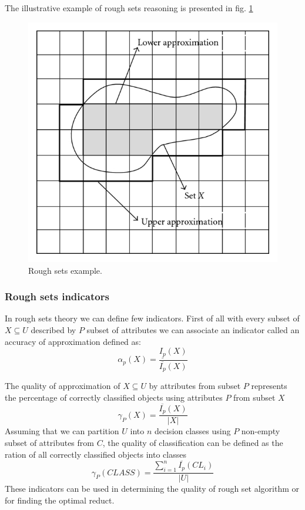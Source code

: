 The illustrative example of rough sets reasoning is presented in fig.
\ref{fig:rough_set_example}
\begin{figure}[H]
    \begin{center}
        \includegraphics{fig/rough_set.png}
    \end{center}
    \caption{Rough sets example.}
    \label{fig:rough_set_example}
\end{figure}

\subsubsection{Rough sets indicators}
\label{cha:Rough_sets_indicators}
In rough sets theory we can define few indicators. First of all with every 
subset of $X \subseteq U$ described by $P$ subset of attributes we can 
associate an indicator called an accuracy of approximation defined as:
$$\alpha_p(X)=\frac{\underline{I_p}(X)}{\overline{I_p}(X)}$$

The quality of approximation of $X \subseteq U$ by attributes from subset $P$
represents the percentage of correctly classified objects using attributes $P$
from subset $X$
$$\gamma_P(X) = \frac{\overline{I_p}(X)}{|X|}$$
Assuming that we can partition $U$ into $n$ decision classes using $P$
non-empty subset of attributes from $C$, the quality of classification can be
defined as the ration of all correctly classified objects into classes
$$\gamma_P(CLASS) = \frac{\sum_{i=1}^{n}\overline{I_p}(CL_i)}{|U|}$$
These indicators can be used in determining the quality of rough set algorithm
or for finding the optimal reduct.
